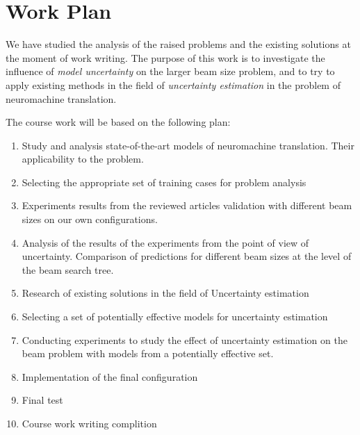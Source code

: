 \documentclass[a4paper,14pt]{extarticle}
\begin{document}
	\section{Work Plan}
	We have studied the analysis of the raised problems and the existing solutions at the moment of work writing. The purpose of this work is to investigate the influence of \textit{model uncertainty} on the larger beam size problem, and to try to apply existing methods in the field of \textit{uncertainty estimation} in the problem of neuromachine translation.
	
	The course work will be based on the following plan:
	\begin{enumerate}
		\item Study and analysis state-of-the-art models of neuromachine translation. Their applicability to the problem.
		\item Selecting the appropriate set of training cases for problem analysis
		\item Experiments results from the reviewed articles validation with different beam sizes on our own configurations.
		\item Analysis of the results of the experiments from the point of view of uncertainty. Comparison of predictions for different beam sizes at the level of the beam search tree.
		\item Research of existing solutions in the field of Uncertainty estimation
		\item Selecting a set of potentially effective models for uncertainty estimation
		\item Conducting experiments to study the effect of uncertainty estimation on the beam problem with models from a potentially effective set.
		\item Implementation of the final configuration
		\item Final test
		\item Course work writing complition
	\end{enumerate}
	
\end{document}
